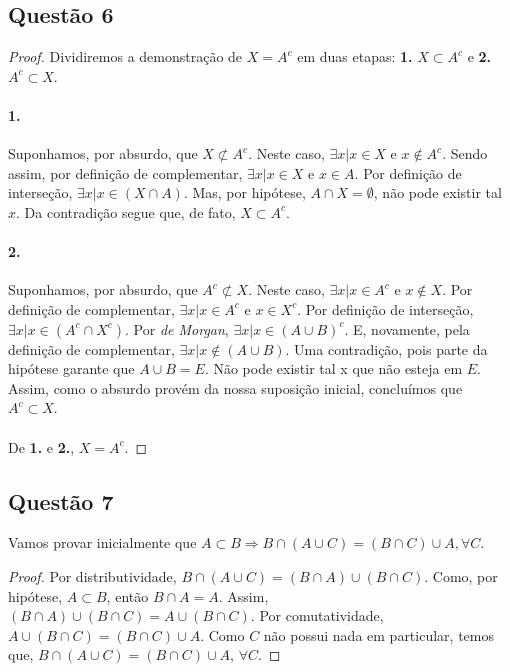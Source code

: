 \documentclass[9pt,twocolumn,a4paper]{article}
\begin{document}
    \subsection{Questão 6}
    \begin{proof}
    Dividiremos a demonstração de $X = A^c$ em duas etapas: \textbf{1.} $X \subset A^c$ e \textbf{2.} $A^c \subset X$.

    \paragraph{1.}
    Suponhamos, por absurdo, que $X \not\subset A^c$. Neste caso, $\exists x | x \in X $ e $x \not\in A^c$. Sendo assim, por definição de complementar, $\exists x | x \in X$ e $x \in A$. Por definição de interseção, $\exists x | x \in (X \cap A)$. Mas, por hipótese, $A \cap X = \emptyset$, não pode existir tal $x$. Da contradição segue que, de fato, $X \subset A^c$.

    \paragraph{2.}
    Suponhamos, por absurdo, que $A^c \not\subset X$. Neste caso, $\exists x | x \in A^c$ e $x \not\in X$. Por definição de complementar, $\exists x | x \in A^c$ e $x \in X^c$. Por definição de interseção, $\exists x | x \in (A^c \cap X^c)$. Por \textit{de Morgan}, $\exists x | x \in (A \cup B)^c$. E, novamente, pela definição de complementar, $\exists x | x \not\in (A \cup B)$. Uma contradição, pois parte da hipótese garante que $A \cup B = E$. Não pode existir tal x que não esteja em $E$. Assim, como o absurdo provém da nossa suposição inicial, concluímos que $A^c \subset X$.

    \paragraph{}
    De \textbf{1.} e \textbf{2.}, $X = A^c$.
    \end{proof}


    \subsection{Questão 7}
    Vamos provar inicialmente que $A \subset B \Rightarrow B \cap (A \cup C) = (B \cap C) \cup A, \forall C$.

    \begin{proof}
    Por distributividade, $B \cap (A \cup C) = (B \cap A) \cup (B \cap C)$. Como, por hipótese, $A \subset B$, então $B \cap A = A$. Assim, $(B \cap A) \cup (B \cap C) = A \cup (B \cap C)$. Por comutatividade, $A \cup (B \cap C) = (B \cap C) \cup A$. Como $C$ não possui nada em particular, temos que, $B \cap (A \cup C) = (B \cap C) \cup A$, $\forall C$.
    \end{proof}
\end{document}
